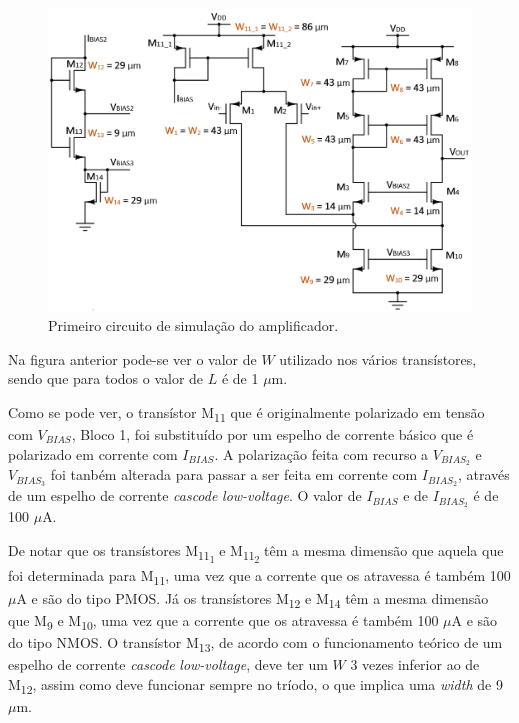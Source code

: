 \documentclass[11pt]{article}
\numberwithin{equation}{section}
\begin{document}
\begin{figure}[H]
	\centering
	\includegraphics[keepaspectratio=true, scale=0.55]{teoricas/primeirasimul}
	\vspace{-0.5em}
	\caption{Primeiro circuito de simulação do amplificador.}
	\vspace{-0.8em}
\end{figure} 

Na figura anterior pode-se ver o valor de $W$ utilizado nos vários transístores, sendo que para todos o valor de $L$ é de 1 $\mu$m.

Como se pode ver, o transístor M\textsubscript{11} que é originalmente polarizado em tensão com $V_{BIAS}$, Bloco 1, foi substituído por um espelho de corrente básico que é polarizado em corrente com $I_{BIAS}$. A polarização feita com recurso a $V_{BIAS_{2}}$ e $V_{BIAS_{3}}$ foi tanbém alterada para passar a ser feita em corrente com $I_{BIAS_{2}}$, através de um espelho de corrente \textit{cascode} \textit{low-voltage}. O valor de $I_{BIAS}$ e de $I_{BIAS_{2}}$ é de 100 $\mu$A.

De notar que os transístores M\textsubscript{11\textsubscript{1}} e M\textsubscript{11\textsubscript{2}} têm a mesma dimensão que aquela que foi determinada para M\textsubscript{11}, uma vez que a corrente que os atravessa é também 100 $\mu$A e são do tipo PMOS. Já os transístores M\textsubscript{12} e M\textsubscript{14} têm a mesma dimensão que M\textsubscript{9} e M\textsubscript{10}, uma vez que a corrente que os atravessa é também 100 $\mu$A e são do tipo NMOS. O transístor M\textsubscript{13}, de acordo com o funcionamento teórico de um espelho de corrente \textit{cascode} \textit{low-voltage}, deve ter um $W$ 3 vezes inferior ao de M\textsubscript{12}, assim como deve funcionar sempre no tríodo, o que implica uma \textit{width} de 9 $\mu$m.
\end{document}

